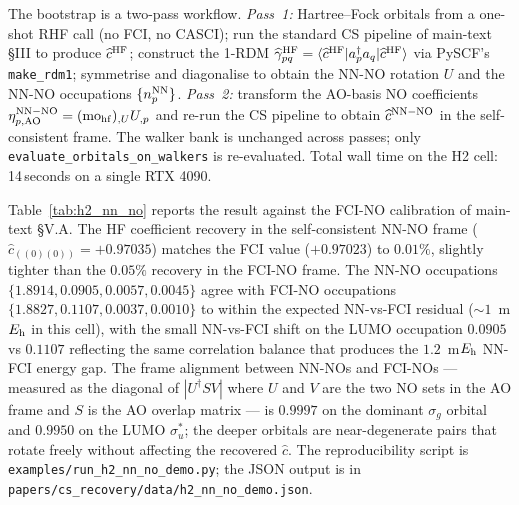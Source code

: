 \documentclass[journal=jctcce,manuscript=suppinfo,layout=traditional]{achemso}
\begin{document}
The bootstrap is a two-pass workflow.
\emph{Pass~1:} Hartree--Fock orbitals from a one-shot RHF call (no
FCI, no CASCI); run the standard CS pipeline of main-text \S III
to produce $\widehat c^{\rm HF}$; construct the 1-RDM
$\widehat \gamma^{\rm HF}_{pq} = \langle \widehat c^{\rm HF} |
a_p^\dagger a_q | \widehat c^{\rm HF} \rangle$ via PySCF's
\texttt{make\_rdm1}; symmetrise and diagonalise to obtain the NN-NO
rotation $U$ and the NN-NO occupations $\{n_p^{\rm NN}\}$.
\emph{Pass~2:} transform the AO-basis NO coefficients
$\eta^{\rm NN-NO}_{p, {\rm AO}} = (\text{mo}_{\rm hf})_{,U} U_{,p}$ and
re-run the CS pipeline to obtain $\widehat c^{\rm NN-NO}$ in the
self-consistent frame. The walker bank is unchanged across passes;
only \texttt{evaluate\_orbitals\_on\_walkers} is re-evaluated.
Total wall time on the H2 cell: 14\,seconds on a single
RTX 4090.

Table~\ref{tab:h2_nn_no} reports the result against the FCI-NO
calibration of main-text \S V.A. The HF coefficient recovery in the
self-consistent NN-NO frame ($\widehat c_{((0)(0))} = +0.97035$)
matches the FCI value ($+0.97023$) to $0.01\%$, slightly tighter than
the $0.05\%$ recovery in the FCI-NO frame. The NN-NO occupations
$\{1.8914, 0.0905, 0.0057, 0.0045\}$ agree with FCI-NO occupations
$\{1.8827, 0.1107, 0.0037, 0.0010\}$ to within the expected
NN-vs-FCI residual ($\sim 1$~m$E_{\rm h}$ in this cell), with the
small NN-vs-FCI shift on the LUMO occupation $0.0905$ vs $0.1107$
reflecting the same correlation balance that produces the $1.2$~m$E_{\rm
h}$ NN-FCI energy gap. The frame alignment between NN-NOs and
FCI-NOs --- measured as the diagonal of $|U^\dagger S V|$ where $U$
and $V$ are the two NO sets in the AO frame and $S$ is the AO overlap
matrix --- is $0.9997$ on the dominant $\sigma_g$ orbital and
$0.9950$ on the LUMO $\sigma_u^*$; the deeper orbitals are
near-degenerate pairs that rotate freely without affecting the
recovered $\widehat c$. The reproducibility script is
\texttt{examples/run\_h2\_nn\_no\_demo.py}; the JSON output is in
\texttt{papers/cs\_recovery/data/h2\_nn\_no\_demo.json}.
\end{document}

